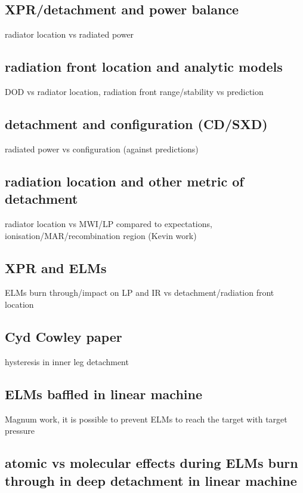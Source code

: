 \subsection{XPR/detachment and power balance}
radiator location vs radiated power
\subsection{radiation front location and analytic models}
DOD vs radiator location, radiation front range/stability vs prediction
\subsection{detachment and configuration (CD/SXD)}
radiated power vs configuration (against predictions)
\subsection{radiation location and other metric of detachment}
radiator location vs MWI/LP compared to expectations, ionisation/MAR/recombination region (Kevin work)
\subsection{XPR and ELMs}
ELMs burn through/impact on LP and IR vs detachment/radiation front location
\subsection{Cyd Cowley paper}
hysteresis in inner leg detachment
\subsection{ELMs baffled in linear machine}
Magnum work, it is possible to prevent ELMs to reach the target with target pressure
\subsection{atomic vs molecular effects during ELMs burn through in deep detachment in linear machine}







